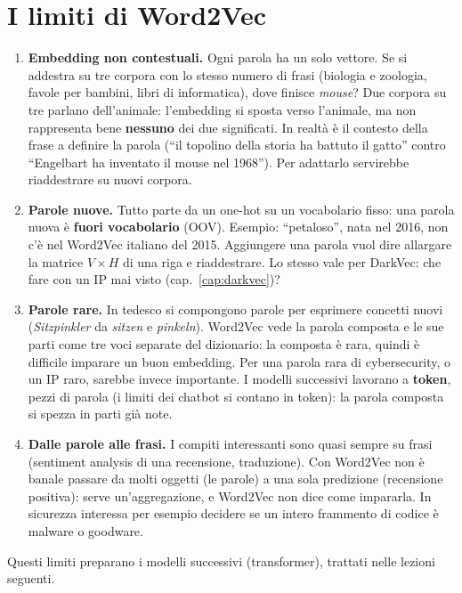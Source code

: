 \section{I limiti di Word2Vec}
\begin{enumerate}
  \item \textbf{Embedding non contestuali.} Ogni parola ha un solo vettore. Se si addestra su tre corpora con lo stesso numero di frasi
        (biologia e zoologia, favole per bambini, libri di informatica), dove finisce \emph{mouse}? Due corpora su tre parlano
        dell'animale: l'embedding si sposta verso l'animale, ma non rappresenta bene \textbf{nessuno} dei due significati. In realtà è
        il contesto della frase a definire la parola (``il topolino della storia ha battuto il gatto'' contro ``Engelbart ha inventato
        il mouse nel 1968''). Per adattarlo servirebbe riaddestrare su nuovi corpora.
  \item \textbf{Parole nuove.} Tutto parte da un one-hot su un vocabolario fisso: una parola nuova è \textbf{fuori vocabolario} (OOV).
        Esempio: ``petaloso'', nata nel 2016, non c'è nel Word2Vec italiano del 2015. Aggiungere una parola vuol dire allargare la
        matrice $V \times H$ di una riga e riaddestrare. Lo stesso vale per DarkVec: che fare con un IP mai visto
        (cap.~\ref{cap:darkvec})?
  \item \textbf{Parole rare.} In tedesco si compongono parole per esprimere concetti nuovi (\emph{Sitzpinkler} da \emph{sitzen} e
        \emph{pinkeln}). Word2Vec vede la parola composta e le sue parti come tre voci separate del dizionario: la composta è rara, quindi
        è difficile imparare un buon embedding. Per una parola rara di cybersecurity, o un IP raro, sarebbe invece importante. I
        modelli successivi lavorano a \textbf{token}, pezzi di parola (i limiti dei chatbot si contano in token): la parola composta
        si spezza in parti già note.
  \item \textbf{Dalle parole alle frasi.} I compiti interessanti sono quasi sempre su frasi (sentiment analysis di una recensione,
        traduzione). Con Word2Vec non è banale passare da molti oggetti (le parole) a una sola predizione (recensione positiva): serve
        un'aggregazione, e Word2Vec non dice come impararla. In sicurezza interessa per esempio decidere se un intero frammento di codice
        è malware o goodware.
\end{enumerate}
Questi limiti preparano i modelli successivi (transformer), trattati nelle lezioni seguenti.

